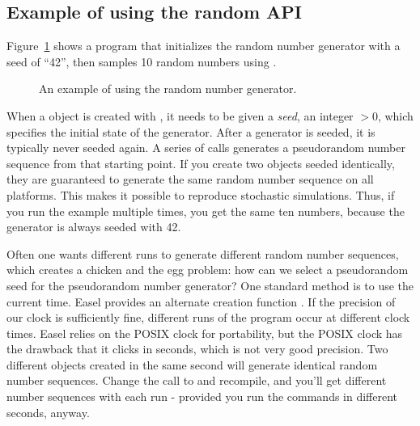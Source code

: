 \subsection{Example of using the random API}

Figure~\ref{fig:random_example} shows a program that initializes the
random number generator with a seed of ``42'', then samples 10 random
numbers using .

\begin{figure}

\caption{An example of using the random number generator.}
\label{fig:random_example}
\end{figure}

When a  object is created with
, it needs to be given a \emph{seed},
an integer $> 0$, which specifies the initial state of the
generator. After a generator is seeded, it is typically never seeded
again. A series of  calls generates a
pseudorandom number sequence from that starting point. If you create
two  objects seeded identically, they are
guaranteed to generate the same random number sequence on all
platforms. This makes it possible to reproduce stochastic simulations.
Thus, if you run the example multiple times, you get the same ten
numbers, because the generator is always seeded with 42.

Often one wants different runs to generate different random number
sequences, which creates a chicken and the egg problem: how can we
select a pseudorandom seed for the pseudorandom number generator? One
standard method is to use the current time. Easel provides an
alternate creation function
. If the precision of our
clock is sufficiently fine, different runs of the program occur at
different clock times. Easel relies on the POSIX clock for
portability, but the POSIX clock has the drawback that it clicks in
seconds, which is not very good precision. Two different
 objects created in the same second will
generate identical random number sequences. Change the
 call to
 and recompile, and you'll
get different number sequences with each run - provided you run the
commands in different seconds, anyway.

